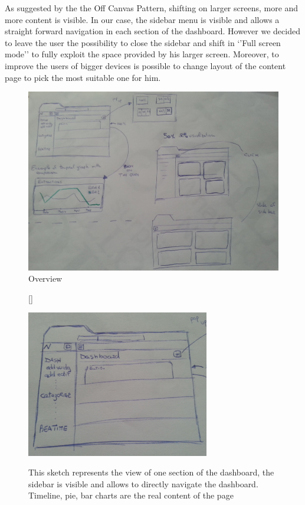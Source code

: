 \documentclass[a4paper,13pt]{report}
\begin{document}
As suggested by the  the Off Canvas Pattern, shifting on larger screens, more and more content is visible. In our case, the sidebar menu is visible and allows a straight forward navigation in each section of the dashboard. However we decided to leave the user the possibility to close the sidebar and shift in `'Full screen mode'' to fully exploit the space provided by his larger screen. Moreover, to improve the users of bigger devices is possible to change layout of the content page to pick the most suitable one  for him.
\begin{figure}[H]
  \caption{Overview}
  \centering
    \includegraphics[width=1\textwidth]{pics/UISketches/desk0}
\end{figure}

\begin{figure}[H]
[\FBwidth]
{\caption{This sketch represents the view of one section of the dashboard, the sidebar is visible and allows to directly navigate the dashboard. Timeline, pie, bar charts are the real content of the page}\label{fig:test}}
{\includegraphics[width=8cm]{pics/UISketches/desk1}}
\end{figure}
\end{document}
